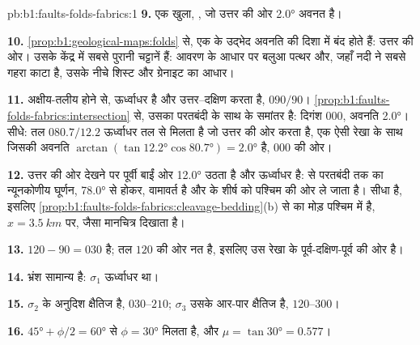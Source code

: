\begin{solution}{pb:b1:faults-folds-fabrics:1}
\textbf{9.} एक खुला, , जो उत्तर की ओर \ang{2.0} अवनत है।

\textbf{10.} \cref{prop:b1:geological-maps:folds} से, एक  के उद्भेद अवनति की दिशा में बंद होते हैं: उत्तर की ओर। उसके केंद्र में सबसे पुरानी चट्टानें हैं: आवरण के आधार पर बलुआ पत्थर और, जहाँ नदी ने सबसे गहरा काटा है, उसके नीचे शिस्ट और ग्रेनाइट का आधार।

\textbf{11.} अक्षीय-तलीय होने से,  ऊर्ध्वाधर है और उत्तर–दक्षिण  करता है,
$090/90$। \cref{prop:b1:faults-folds-fabrics:intersection} से, उसका परतबंदी के साथ
  के समांतर है: दिगंश
$000$, अवनति \ang{2.0}। सीधे: तल $080.7/12.2$ ऊर्ध्वाधर तल से मिलता है
जो उत्तर की ओर  करता है, एक ऐसी रेखा के साथ जिसकी अवनति $\arctan(\tan\ang{12.2}
\cos\ang{80.7}) = \ang{2.0}$ है, $000$ की ओर।

\textbf{12.} उत्तर की ओर देखने पर पूर्वी  बाईं ओर \ang{12.0} उठता है
और  ऊर्ध्वाधर है:  से परतबंदी तक का न्यूनकोणीय घूर्णन, \ang{78.0} से होकर, वामावर्त है और  के शीर्ष को पश्चिम की ओर ले जाता है।  सीधा है, इसलिए
\cref{prop:b1:faults-folds-fabrics:cleavage-bedding}(b) से  का मोड़ पश्चिम में है, $x = \qty{3.5}{km}$ पर, जैसा मानचित्र दिखाता है।

\textbf{13.}  $120 - 90 = 030$ है; तल $120$ की ओर नत है, इसलिए
 उस रेखा के पूर्व-दक्षिण-पूर्व की ओर है।

\textbf{14.} भ्रंश सामान्य है: $\sigma_1$ ऊर्ध्वाधर था।

\textbf{15.} $\sigma_2$  के अनुदिश क्षैतिज है, $030$--$210$;
$\sigma_3$ उसके आर-पार क्षैतिज है, $120$--$300$।

\textbf{16.} $\ang{45} + \phi/2 = \ang{60}$ से $\phi = \ang{30}$ मिलता है, और
$\mu = \tan\ang{30} = 0.577$।


\end{solution}
